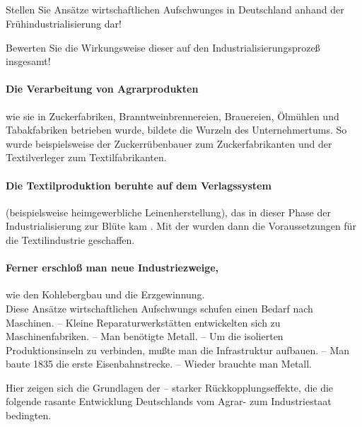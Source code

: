 
\subsection{}
\label{ssc:frueh-ind}

\begin{aufgabe}
Stellen Sie Ansätze wirtschaftlichen Aufschwunges in Deutschland
anhand der Frühindustrialisierung dar!

Bewerten Sie die Wirkungsweise dieser auf den
Industrialisierungsprozeß insgesamt!
\end{aufgabe}

\paragraph{Die Verarbeitung von Agrarprodukten} wie sie in
Zuckerfabriken, Branntweinbrennereien, Brauereien, Ölmühlen und
Tabakfabriken betrieben wurde, bildete die Wurzeln des
Unternehmertums. So wurde beispielsweise der Zuckerrübenbauer zum
Zuckerfabrikanten und der Textilverleger zum Textilfabrikanten.

\paragraph{Die Textilproduktion beruhte auf dem Verlagssystem}
(beispielsweise heimgewerbliche Leinenherstellung), das in dieser
Phase der Industrialisierung zur Blüte kam
.  Mit der  wurden dann die Voraussetzungen für die
Textilindustrie geschaffen.

\paragraph{Ferner erschloß man neue Industriezweige,} wie den
Kohlebergbau und die Erzgewinnung.\\

Diese Ansätze wirtschaftlichen Aufschwungs schufen einen Bedarf nach
Maschinen. -- Kleine Reparaturwerkstätten entwickelten sich zu
Maschinenfabriken. -- Man benötigte Metall. -- Um die isolierten
Produktionsinseln zu verbinden, mußte man die Infrastruktur aufbauen.
-- Man baute 1835 die erste Eisenbahnstrecke. -- Wieder brauchte man
Metall.

Hier zeigen sich die Grundlagen der  -- starker
Rückkopplungseffekte, die die folgende rasante Entwicklung
Deutschlands vom Agrar- zum Industriestaat bedingten.

